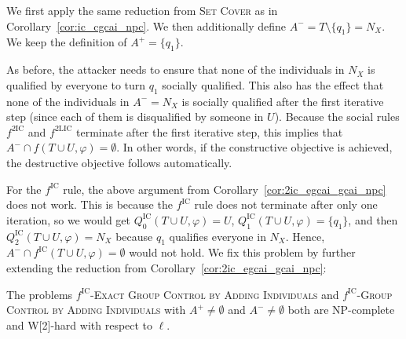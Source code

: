 \documentclass[
    12pt,               %
    a4paper,            %
    bibtotoc,           %
    pointlessnumbers,   %
    ngerman,            %
    titlepage,          %
    leqno,              %
    ]{scrarticle}       %
\newcommand\corref{Corollary~\ref}
\begin{document}
\begin{Proof}
We first apply the same reduction from \textsc{Set Cover} as in \corref{cor:ic_cgcai_npc}. We then additionally define $A^- = T \setminus \{q_1\} = N_X$. We keep the definition of $A^+ = \{q_1\}$.

As before, the attacker needs to ensure that none of the individuals in $N_X$ is qualified by everyone to turn $q_1$ socially qualified. This also has the effect that none of the individuals in $A^- = N_X$ is socially qualified after the first iterative step (since each of them is disqualified by someone in $U$). Because the social rules $f^{\text{2IC}}$ and $f^{\text{2LIC}}$ terminate after the first iterative step, this implies that $A^- \cap f(T \cup U, \varphi) = \emptyset$. In other words, if the constructive objective is achieved, the destructive objective follows automatically.
\end{Proof}



For the $f^{\text{IC}}$ rule, the above argument from \corref{cor:2ic_egcai_gcai_npc} does not work. This is because the $f^{\text{IC}}$ rule does not terminate after only one iteration, so we would get $Q^{\text{IC}}_0(T \cup U, \varphi) = U$, $Q^{\text{IC}}_1(T \cup U, \varphi) = \{q_1\}$, and then $Q^{\text{IC}}_2(T \cup U, \varphi) = N_X$ because $q_1$ qualifies everyone in $N_X$. Hence, $A^- \cap f^{\text{IC}}(T \cup U, \varphi) = \emptyset$ would not hold. We fix this problem by further extending the reduction from \corref{cor:2ic_egcai_gcai_npc}:

\begin{Corollary} \label{cor:ic_egcai_gcai_npc}
The problems $f^{\text{IC}}$-\textsc{Exact Group Control by Adding Individuals} and $f^{\text{IC}}$-\textsc{Group Control by Adding Individuals} with $A^+ \neq \emptyset$ and $A^- \neq \emptyset$ both are NP-complete and W[2]-hard with respect to $\ell$.
\end{Corollary}
\end{document}
